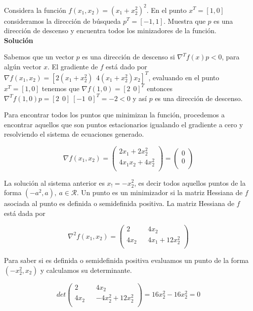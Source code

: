 \documentclass[conference]{IEEEtran}
\begin{document}
Considera la función $f(x_1, x_2) = (x_1 + x_2^2)^2$. En el punto $x^T = [1, 0]$
consideramos la dirección de búsqueda $p^T = [-1, 1]$. Muestra que $p$ es una
dirección de descenso y encuentra todos los minizadores de la función. \\

\textbf{Solución}

Sabemos que un vector $p$ es una dirección de descenso si $\nabla^T f(x) p < 0$,
para algún vector $x$. El gradiente de $f$ está dado por
$\nabla f(x_1, x_2) = [2(x_1+x_2^2)\ \ 4(x_1 + x_2^2)x_2]^T$, evaluando en el punto
$x^T = [1, 0]$ tenemos que $\nabla f(1, 0) = [2\ \ 0]^T$ entonces
$\nabla^T f(1, 0) p =  [2\ \ 0]\ [-1\ \ 0]^T = -2 < 0$ y así $p$ es una
dirección de descenso. \

Para encontrar todos los puntos que minimizan la función, procedemos a
encontrar aquellos que son puntos estacionarios igualando el gradiente a cero y
resolviendo el sistema de ecuaciones generado.

$$
\nabla f(x_1, x_2) =
\begin{pmatrix}
	2 x_1 + 2 x_2^2 \\
	4 x_1x_2 + 4 x_2^2 \\
\end{pmatrix} =
\begin{pmatrix}
    0 \\
    0 \\
\end{pmatrix}
$$

La solución al sistema anterior es $x_! = -x_2^2$, es decir todos aquellos puntos
de la forma $(-a^2, a),\ a \in \mathcal{R}$. Un punto es un minimizador si la matriz
Hessiana de $f$ asociada al punto es definida o semidefinida positiva. La matriz
Hessiana de $f$ está dada por

$$
\nabla^2 f(x_1, x_2) =
\begin{pmatrix}
	2 && 4x_2 \\
	4x_2 && 4x_1 + 12x_2^2 \\
\end{pmatrix}
$$

Para saber si es definida o semidefinida positiva evaluamos un punto de la forma
$(-x_2^2, x_2)$ y calculamos su determinante.

$$
det
\begin{pmatrix}
	2 && 4x_2 \\
	4x_2 && -4x_2^2 + 12x_2^2 \\
\end{pmatrix} =
16x_2^2 - 16x_2^2 = 0
$$
\end{document}
